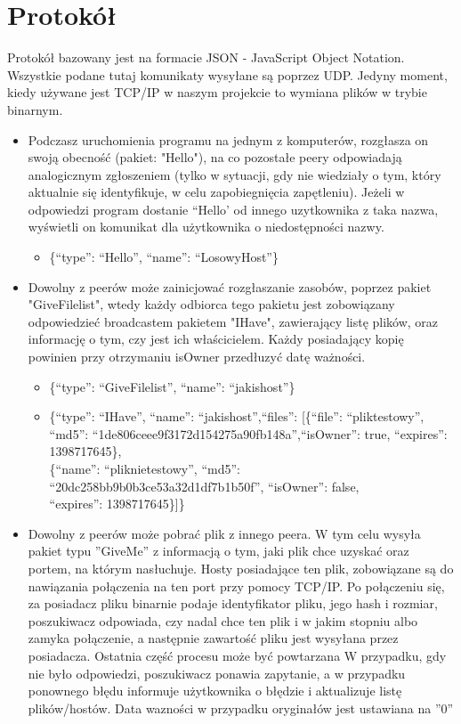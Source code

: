 \documentclass[10pt,a4paper]{article}
\begin{document}
\section{Protokół}
Protokół bazowany jest na formacie JSON - JavaScript Object Notation.
Wszystkie podane tutaj komunikaty wysyłane są poprzez UDP. Jedyny moment,
kiedy używane jest TCP/IP w naszym projekcie to wymiana plików w trybie
binarnym.

\begin{itemize}
\item Podczasz uruchomienia programu na jednym z komputerów, rozgłasza on swoją obecność (pakiet: "Hello"), na co pozostałe peery odpowiadają analogicznym zgłoszeniem (tylko w sytuacji, gdy nie wiedziały o tym, który aktualnie się identyfikuje, w celu zapobiegnięcia zapętleniu). Jeżeli w odpowiedzi program dostanie “Hello’ od innego uzytkownika z taka nazwa, wyświetli on komunikat dla użytkownika o niedostępności nazwy.
\renewcommand{\labelitemii}{$\circ$}
\begin{itemize}
\item \{“type”: “Hello”, “name”: “LosowyHost”\}
\end{itemize}
\item Dowolny z peerów może zainicjować rozgłaszanie zasobów, poprzez pakiet "GiveFilelist", wtedy każdy odbiorca tego pakietu jest zobowiązany odpowiedzieć broadcastem pakietem "IHave", zawierający listę plików, oraz informację o tym, czy jest ich właścicielem. Każdy posiadający kopię powinien przy otrzymaniu isOwner przedłuzyć datę ważności.
\begin{itemize}
\item \{“type”: “GiveFilelist”, “name”: “jakishost”\}
\item \{“type”: “IHave”, “name”: “jakishost”,“files”: [\{“file”: “pliktestowy”, 
\\“md5”: “1de806ceee9f3172d154275a90fb148a”,“isOwner”: true, “expires”: 1398717645\}, 
\\\{“name”: “pliknietestowy”, “md5”: “20dc258bb9b0b3ce53a32d1df7b1b50f”, “isOwner”: false, 
\\“expires”: 1398717645\}]\}
\end{itemize}
\item Dowolny z peerów może pobrać plik z innego peera. W tym celu wysyła pakiet typu ''GiveMe'' z informacją o tym, jaki plik chce uzyskać oraz portem, na którym nasłuchuje. Hosty posiadające ten plik, zobowiązane są do nawiązania połączenia na ten port przy pomocy TCP/IP. Po połączeniu się, za posiadacz pliku binarnie podaje identyfikator pliku, jego hash i rozmiar, poszukiwacz odpowiada, czy nadal chce ten plik i w jakim stopniu albo zamyka połączenie, a następnie zawartość pliku jest wysyłana przez posiadacza. Ostatnia część procesu może być powtarzana W przypadku, gdy nie było odpowiedzi, poszukiwacz ponawia zapytanie, a w przypadku ponownego błędu informuje użytkownika o błędzie i aktualizuje listę plików/hostów. Data wazności w przypadku oryginałów jest ustawiana na ''0''

\end{itemize}
\end{document}
